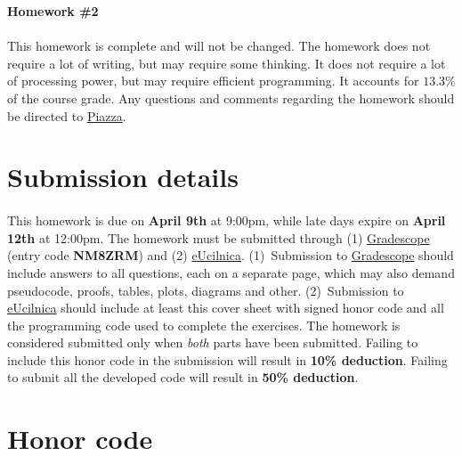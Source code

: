 \documentclass[11pt,a4paper]{article}
\begin{document}
 

\thispagestyle{titlestyle}

\vspace*{0.05in} 
\begin{center} 
	{\huge\bf Homework {\color{magenta}\#2}} 
\end{center} 
\vspace*{0.05in} 

\paragraph{} This homework is complete and will not be changed. The homework does not require a lot of writing, but may require some thinking. It does not require a lot of processing power, but may require efficient programming. It accounts for $13.3\%$ of the course grade. Any questions and comments regarding the homework should be directed to \href{https://piazza.com/class/kkn1oz577n2sq}{Piazza}.

\section*{Submission details}

\paragraph{} This homework is due on {\bf\color{magenta} April 9th} at 9:00pm, while late days expire on {\bf\color{magenta} April 12th} at 12:00pm. The homework must be submitted through (1) \href{https://www.gradescope.com}{Gradescope} (entry code {\bf NM8ZRM}) and (2) \href{https://ucilnica.fri.uni-lj.si/course/view.php?id=183}{eUcilnica}. (1)~Submission to \href{https://www.gradescope.com}{Gradescope} should include answers to all questions, each on a separate page, which may also demand pseudocode, proofs, tables, plots, diagrams and other. (2)~Submission to \href{https://ucilnica.fri.uni-lj.si/course/view.php?id=183}{eUcilnica} should include at least this cover sheet with signed honor code and all the programming code used to complete the exercises. The homework is considered submitted only when \textit{both} parts have been submitted. Failing to include this honor code in the submission will result in {\bf\color{LimeGreen} 10\% deduction}. Failing to submit all the developed code will result in {\bf\color{LimeGreen} 50\% deduction}.

\section*{Honor code}
\end{document}
